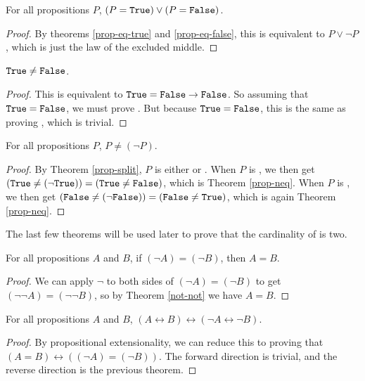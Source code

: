 \documentclass[../math.tex]{subfiles}
\begin{document}
\begin{theorem} \label{prop-split}
    For all propositions $P$, $(P = \vtt{True}) \vee (P = \vtt{False})$.
\end{theorem}
\begin{proof}
    By theorems \ref{prop-eq-true} and \ref{prop-eq-false}, this is equivalent
    to $P \vee \neg P$, which is just the law of the excluded middle.
\end{proof}

\begin{theorem} \label{prop-neq}
    $\vtt{True} \neq \vtt{False}$.
\end{theorem}
\begin{proof}
    This is equivalent to $\vtt{True} = \vtt{False} \rightarrow \vtt{False}$.
    So assuming that $\vtt{True} = \vtt{False}$, we must prove .  But
    because $\vtt{True} = \vtt{False}$, this is the same as proving ,
    which is trivial.
\end{proof}

\begin{theorem}
    For all propositions $P$, $P \neq (\neg P)$.
\end{theorem}
\begin{proof}
    By Theorem \ref{prop-split}, $P$ is either  or .  When
    $P$ is , we then get $(\vtt{True} \neq (\neg \vtt{True})) =
    (\vtt{True} \neq \vtt{False})$, which is Theorem \ref{prop-neq}.  When $P$
    is , we then get $(\vtt{False} \neq (\neg \vtt{False})) =
    (\vtt{False} \neq \vtt{True})$, which is again Theorem \ref{prop-neq}.
\end{proof}
\noindent The last few theorems will be used later to prove that the cardinality
of  is two.

\begin{theorem} \label{not-eq-eq}
    For all propositions $A$ and $B$, if $(\neg A) = (\neg B)$, then $A = B$.
\end{theorem}
\begin{proof}
    We can apply $\neg$ to both sides of $(\neg A) = (\neg B)$ to get $(\neg
    \neg A) = (\neg \neg B)$, so by Theorem \ref{not-not} we have $A = B$.
\end{proof}

\begin{theorem} \label{not-eq-iff}
    For all propositions $A$ and $B$, $(A \leftrightarrow B) \leftrightarrow
    (\neg A \leftrightarrow \neg B)$.
\end{theorem}
\begin{proof}
    By propositional extensionality, we can reduce this to proving that $(A = B)
    \leftrightarrow ((\neg A) = (\neg B))$.  The forward direction is trivial,
    and the reverse direction is the previous theorem.
\end{proof}
\end{document}
